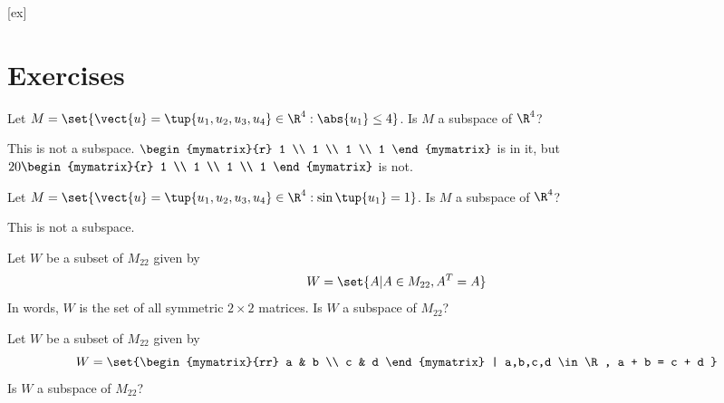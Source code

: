 [ex]
\section*{Exercises}

\begin{enumialphparenastyle}

\begin{ex} Let $M=\set{\vect{u}=\tup{u_{1},u_{2},u_{3},u_{4}} \in 
\R^{4}:\abs{u_{1}} \leq 4}$. Is $M$ a subspace of $\R^4$?
\begin{sol}
This is not a subspace. $\begin{mymatrix}{r}
1 \\
1 \\
1 \\
1
\end{mymatrix} $ is in
it, but $20\begin{mymatrix}{r}
1 \\
1 \\
1 \\
1
\end{mymatrix} $ is not. 
\end{sol}
\end{ex}

\begin{ex} Let $M=\set{\vect{u}=\tup{u_{1},u_{2},u_{3},u_{4}} \in 
\R^{4}:\sin \tup{u_{1}} =1}$. Is $M$ a subspace of $\R^4$?
\begin{sol}
This is not a subspace.
\end{sol}
\end{ex}

\begin{ex} Let $W$ be a subset of $M_{22}$ given by 
\[
W = \set{A | A \in M_{22}, A^T = A }  
\]
In words, $W$ is the set of all symmetric $2 \times 2$ matrices. Is $W$ a subspace of $M_{22}$?
\end{ex}

\begin{ex} Let $W$ be a subset of $M_{22}$ given by 
\[
W = \set{\begin{mymatrix}{rr}
a  & b \\
c & d 
\end{mymatrix} | a,b,c,d \in \R, a + b = c + d }
\]
Is $W$ a subspace of $M_{22}$?
\end{ex}


\end{enumialphparenastyle}
